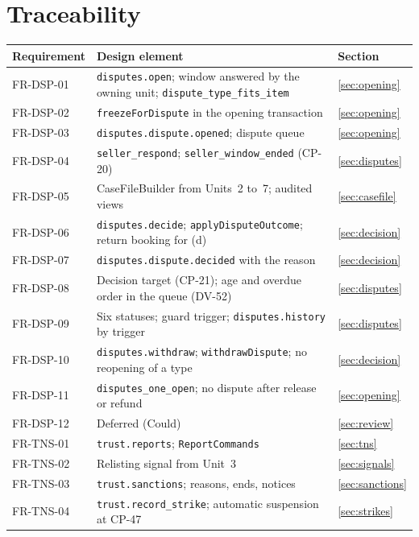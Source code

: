 \documentclass[11pt,a4paper]{article}
\begin{document}
\section{Traceability}
\label{app:trace}
{\small\begin{longtable}{@{}>{\ttfamily}p{2.4cm}>{\raggedright\arraybackslash}p{10.6cm}>{\raggedright\arraybackslash}p{2.2cm}@{}}
\toprule \textnormal{\textbf{Requirement}} & \textbf{Design element} & \textbf{Section} \\ \midrule \endhead
FR-DSP-01 & \texttt{disputes.open}; window answered by the owning unit; \texttt{dispute\_type\_fits\_item} & \ref{sec:opening} \\
FR-DSP-02 & \texttt{freezeForDispute} in the opening transaction & \ref{sec:opening} \\
FR-DSP-03 & \texttt{disputes.dispute.opened}; dispute queue & \ref{sec:opening} \\
FR-DSP-04 & \texttt{seller\_respond}; \texttt{seller\_window\_ended} (CP-20) & \ref{sec:disputes} \\
FR-DSP-05 & CaseFileBuilder from Units~2 to~7; audited views & \ref{sec:casefile} \\
FR-DSP-06 & \texttt{disputes.decide}; \texttt{applyDisputeOutcome}; return booking for (d) & \ref{sec:decision} \\
FR-DSP-07 & \texttt{disputes.dispute.decided} with the reason & \ref{sec:decision} \\
FR-DSP-08 & Decision target (CP-21); age and overdue order in the queue (DV-52) & \ref{sec:disputes} \\
FR-DSP-09 & Six statuses; guard trigger; \texttt{disputes.history} by trigger & \ref{sec:disputes} \\
FR-DSP-10 & \texttt{disputes.withdraw}; \texttt{withdrawDispute}; no reopening of a type & \ref{sec:decision} \\
FR-DSP-11 & \texttt{disputes\_one\_open}; no dispute after release or refund & \ref{sec:opening} \\
FR-DSP-12 & Deferred (Could) & \ref{sec:review} \\
FR-TNS-01 & \texttt{trust.reports}; \texttt{ReportCommands} & \ref{sec:tns} \\
FR-TNS-02 & Relisting signal from Unit~3 & \ref{sec:signals} \\
FR-TNS-03 & \texttt{trust.sanctions}; reasons, ends, notices & \ref{sec:sanctions} \\
FR-TNS-04 & \texttt{trust.record\_strike}; automatic suspension at CP-47 & \ref{sec:strikes} \\

\end{longtable}}
\end{document}
